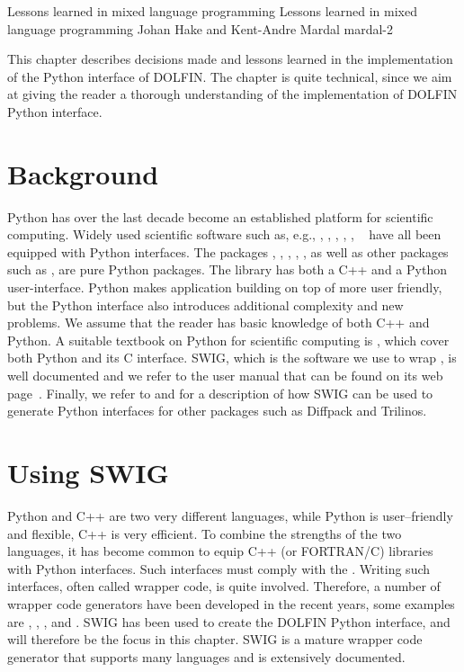               {Lessons learned in mixed language programming}
              {Lessons learned in mixed language programming}
              {Johan Hake and Kent-Andre Mardal}
              {mardal-2}

This chapter describes decisions made and lessons learned in the
implementation of the Python interface of DOLFIN. The chapter is quite
technical, since we aim at giving the reader a thorough understanding
of the implementation of DOLFIN Python interface.

\section{Background}
Python has over the last decade become an established platform
for scientific computing. Widely used scientific software such as,
e.g., \citet{www:petsc}, \citet{www:hypre}, \citet{www:trilinos},
\citet{www:vtk}, \citet{www:vmtk}, \ginac~\citep{BauerFrinkKreckel2000}
have all been equipped with Python interfaces. The \fenics
packages \ferari, \fiat , \ffc, \ufl, \viper, as well as other
packages such as \sympy\citep{CertikSeoanePetersonEtAl2009},
\scipy\citep{JonesOliphantPetersonEtAl2009} are pure Python packages.
The \dolfin library has both a C++ and a Python user-interface. Python
makes application building on top of \dolfin more user friendly,
but the Python interface also introduces additional complexity and
new problems. We assume that the reader has basic knowledge of
both C++ and Python. A suitable textbook on Python for scientific
computing is \citet{Langtangen2008}, which cover both Python and its
C interface.  SWIG, which is the software we use to wrap \dolfin, is
well documented and we refer to the user manual that can be found on its
web page~\citep{www:swig}. Finally, we refer to \citet{Langtangen2003b}
and \citet{SalaSpotzHeroux2008} for a description of how SWIG can be
used to generate Python interfaces for other packages such as Diffpack
and Trilinos.

\section{Using SWIG}

Python and C++ are two very different languages, while Python is
user--friendly and flexible, C++ is very efficient.  To combine the
strengths of the two languages, it has become common to equip C++ (or
FORTRAN/C) libraries with Python interfaces.  Such interfaces must comply
with the \citet{www:python-capi}.  Writing such interfaces, often called
wrapper code, is quite involved.  Therefore, a number of wrapper code
generators have been developed in the recent years, some examples are
\citet{Peterson}, \citet{SIP}, \citet{Siloon}, and \citet{www:swig}.
SWIG has been used to create the DOLFIN Python interface, and will
therefore be the focus in this chapter. SWIG is a mature wrapper code
generator that supports many languages and is extensively documented.

